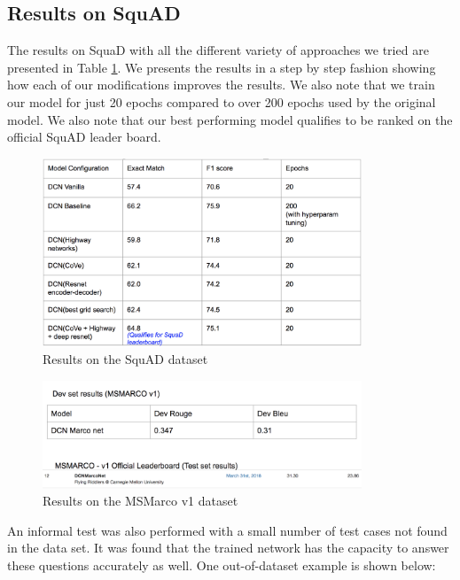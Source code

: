 \subsection{Results on SquAD}
The results on SquaD with all the different variety of approaches we tried are presented in Table \ref{im:squad_res}. We presents the results in a step by step fashion showing how each of our modifications improves the results. We also note that we train our model for just 20 epochs compared to over 200 epochs used by the original model. We also note that our best performing model qualifies to be ranked on the official SquAD leader board.
\begin{figure}[h]
    \centering
    \includegraphics[width=0.85\textwidth]{images/res_squad.png}
    \caption{Results on the SquAD dataset}
    \label{im:squad_res}
\end{figure}

\begin{figure}[h]
    \centering
    \includegraphics[width=0.85\textwidth]{images/res_marco.png}
    \caption{Results on the MSMarco v1 dataset}
    \label{im:res_marco}
\end{figure}





An informal test was also performed with a small number of test cases not found in the data set. It was found that the trained network has the capacity to answer these questions accurately as well. One out-of-dataset example is shown below:

